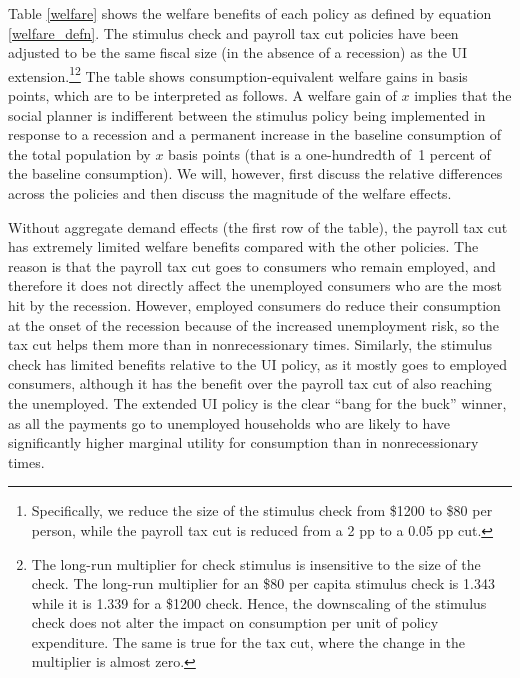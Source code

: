 \documentclass[\econtexRoot/HAFiscal]{subfiles}
\begin{document}
Table \ref{welfare} shows the welfare benefits of each policy as defined by equation \eqref{welfare_defn}. The stimulus check and payroll tax cut policies have been adjusted to be the same fiscal size (in the absence of a recession) as the UI extension.\footnote{Specifically, we reduce the size of the stimulus check from \$1200 to \$80 per person, while the payroll tax cut is reduced from a 2 pp to a 0.05 pp cut.}\footnote{The long-run multiplier for check stimulus is insensitive to the size of the check. The long-run multiplier for an \$80 per capita stimulus check is 1.343 while it is 1.339 for a \$1200 check. Hence, the downscaling of the stimulus check does not alter the impact on consumption per unit of policy expenditure. The same is true for the tax cut, where the change in the multiplier is almost zero.} The table shows consumption-equivalent welfare gains in basis points, which are to be interpreted as follows. A welfare gain of $x$ implies that the social planner is indifferent between the stimulus policy being implemented in response to a recession and a permanent increase in the baseline consumption of the total population by $x$ basis points (that is a one-hundredth of~1 percent of the baseline consumption). We will, however, first discuss the relative differences across the policies and then discuss the magnitude of the welfare effects.

Without aggregate demand effects (the first row of the table), the payroll tax cut has extremely limited welfare benefits compared with the other policies. The reason is that the payroll tax cut goes to consumers who remain employed, and therefore it does not directly affect the unemployed consumers who are the most hit by the recession. However, employed consumers do reduce their consumption at the onset of the recession because of the increased unemployment risk, so the tax cut helps them more than in nonrecessionary times. Similarly, the stimulus check has limited benefits relative to the UI policy, as it mostly goes to employed consumers, although it has the benefit over the payroll tax cut of also reaching the unemployed. The extended UI policy is the clear ``bang for the buck'' winner, as all the payments go to unemployed households who are likely to have significantly higher marginal utility for consumption than in nonrecessionary times.
\end{document}
